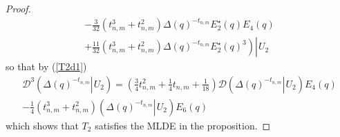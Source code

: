 \documentclass[10pt,a4paper]{amsart}
\newcommand{\utwo}[1]{\left. #1 \right\rvert \hspace{1pt} U_{2}}
\begin{document}
\begin{proof}
\begin{multline*}
           \left. \left. - \frac{3}{32} \left( t_{n,m}^{3} + t_{n,m}^{2} \right) \Delta (q)^{- t_{n,m}} E_{2}^{\star}(q)E_{4}(q) \right. \right. \\
           \utwo{ \left. + \frac{11}{32} \left( t_{n,m}^{3} + t_{n,m}^{2} \right) \Delta (q)^{- t_{n,m}} E_{2}^{\star}(q)^{3} \right) }
       \end{multline*}
       so that by (\ref{T2d1})
       \begin{multline*}
           \mathcal{D}^{3} \left( \utwo{ \Delta (q)^{- t_{n,m}} } \right) = \left( \frac{3}{4} t_{n,m}^{2} + \frac{1}{4} t_{n,m} + \frac{1}{18} \right) \mathcal{D} \left( \utwo{ \Delta (q)^{- t_{n,m}} } \right) E_{4}(q) \\
           - \frac{1}{4} \left( t_{n,m}^{3} + t_{n,m}^{2} \right) \left( \utwo{ \Delta (q)^{- t_{n,m}} } \right) E_{6}(q)
       \end{multline*}
       which shows that $T_{2}$ satisfies the MLDE in the proposition.
\end{proof}
\end{document}
